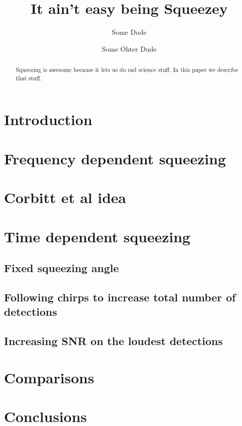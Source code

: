 \documentclass[aps,prd,superscriptaddress,nofootinbib,showpacs,letterpaper]{revtex4-1}
\begin{document}
\title{It ain't easy being Squeezey}

\author{Some Dude}
\author{Some Ohter Dude}


\begin{abstract}
Squeezing is awesome because it lets us do rad science stuff.  In this paper we
describe that stuff.
\end{abstract}

\maketitle

\section{Introduction}

\section{Frequency dependent squeezing}

\section{Corbitt et al idea}

\section{Time dependent squeezing}

\subsection{Fixed squeezing angle}

\subsection{Following chirps to increase total number of detections}

\subsection{Increasing SNR on the loudest detections}

\section{Comparisons}

\section{Conclusions}

%
\end{document}
